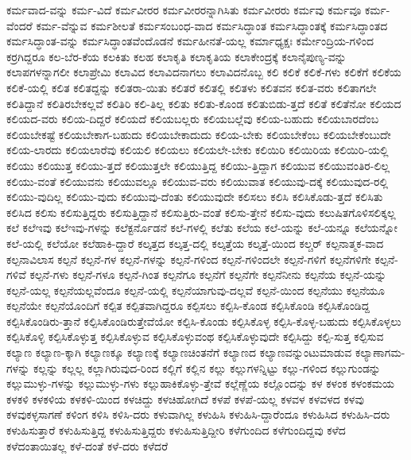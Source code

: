 {ಕರ್ಮವಾದ-ವನ್ನು
ಕರ್ಮ-ವಿದೆ
ಕರ್ಮವೀರರ
ಕರ್ಮವೀರರನ್ನಾಗಿಸಿತು
ಕರ್ಮವೀರರು
ಕರ್ಮವು
ಕರ್ಮವೂ
ಕರ್ಮ-ವೆಂದರೆ
ಕರ್ಮ-ವೆನ್ನುವ
ಕರ್ಮಶೀಲತೆ
ಕರ್ಮಸಂಬಂಧ-ವಾದ
ಕರ್ಮಸಿದ್ಧಾಂತ
ಕರ್ಮಸಿದ್ಧಾಂತಕ್ಕೆ
ಕರ್ಮಸಿದ್ಧಾಂತದ
ಕರ್ಮಸಿದ್ಧಾಂತ-ವನ್ನು
ಕರ್ಮಸಿದ್ಧಾಂತವೆಂದೊಡನೆ
ಕರ್ಮಹೀನತೆ-ಯಲ್ಲ
ಕರ್ಮಾಧ್ಯಕ್ಷಃ
ಕರ್ಮೇಂದ್ರಿಯ-ಗಳಿಂದ
ಕರ್ರಗಿದ್ದರೂ
ಕಲ-ಬೆರ-ಕೆಯ
ಕಲಕಿತು
ಕಲಹ
ಕಲಾಕೃತಿ
ಕಲಾಕೃತಿಯ
ಕಲಾಕೇಂದ್ರಕ್ಕೆ
ಕಲಾನೈಪುಣ್ಯ-ವನ್ನು
ಕಲಾಪಗಳನ್ನಾಗಲೀ
ಕಲಾಪ್ರೇಮಿ
ಕಲಾವಿದ
ಕಲಾವಿದನಾಗಲು
ಕಲಾವಿದನೊಬ್ಬ
ಕಲಿ
ಕಲಿಕೆ
ಕಲಿಕೆ-ಗಳು
ಕಲಿಕೆಗೆ
ಕಲಿಕೆಯ
ಕಲಿಕೆ-ಯಲ್ಲಿ
ಕಲಿತ
ಕಲಿತದ್ದನ್ನು
ಕಲಿತರಾ-ಯಿತು
ಕಲಿತರೆ
ಕಲಿತಲ್ಲಿ
ಕಲಿತಳು
ಕಲಿತವನ
ಕಲಿತ-ವರು
ಕಲಿತಾಗಲೇ
ಕಲಿತಿದ್ದಾನೆ
ಕಲಿತಿರಬೇಕಲ್ಲವೆ
ಕಲಿತಿರಿ
ಕಲಿ-ತಿಲ್ಲ
ಕಲಿತು
ಕಲಿತು-ಕೊಂಡ
ಕಲಿತುಬಿಡು-ತ್ತದೆ
ಕಲಿತೆ
ಕಲಿತೆನೋ
ಕಲಿಯದ
ಕಲಿಯದ-ವರು
ಕಲಿಯ-ದಿದ್ದರೆ
ಕಲಿಯದೆ
ಕಲಿಯಬಲ್ಲರು
ಕಲಿಯಬಲ್ಲೆವು
ಕಲಿಯ-ಬಹುದು
ಕಲಿಯಬಾರದೆಂಬ
ಕಲಿಯಬೇಕಷ್ಟೆ
ಕಲಿಯಬೇಕಾಗ-ಬಹುದು
ಕಲಿಯಬೇಕಾದುದು
ಕಲಿಯ-ಬೇಕು
ಕಲಿಯಬೇಕೆಂಬ
ಕಲಿಯಬೇಕೆಂಬುದೇ
ಕಲಿಯ-ಲಾರದು
ಕಲಿಯಲಾರೆವು
ಕಲಿಯಲಿ
ಕಲಿಯಲು
ಕಲಿಯಲೇ-ಬೇಕು
ಕಲಿಯಿರಿ
ಕಲಿಯಿರಿಯ
ಕಲಿಯಿರಿ-ಯಲ್ಲಿ
ಕಲಿಯು
ಕಲಿಯುತ್ತ
ಕಲಿಯು-ತ್ತದೆ
ಕಲಿಯುತ್ತಲೇ
ಕಲಿಯುತ್ತಿದ್ದ
ಕಲಿಯು-ತ್ತಿದ್ದಾಗ
ಕಲಿಯುವ
ಕಲಿಯುವಂತಿರ-ಲಿಲ್ಲ
ಕಲಿಯು-ವಂತೆ
ಕಲಿಯುವನು
ಕಲಿಯುವಲ್ಲೂ
ಕಲಿಯುವ-ವರು
ಕಲಿಯುವಾತ
ಕಲಿಯುವು-ದಕ್ಕೆ
ಕಲಿಯುವುದ-ರಲ್ಲಿ
ಕಲಿಯು-ವುದಿಲ್ಲ
ಕಲಿಯು-ವುದು
ಕಲಿಯುವು-ದೆಂತು
ಕಲಿಯುವುದೇ
ಕಲಿಸಲು
ಕಲಿಸಿ
ಕಲಿಸಿಕೊಡು-ತ್ತದೆ
ಕಲಿಸಿತು
ಕಲಿಸಿದ
ಕಲಿಸು
ಕಲಿಸುತ್ತಿದ್ದರು
ಕಲಿಸುತ್ತಿದ್ದಾನೆ
ಕಲಿಸುತ್ತಿರು-ವಂತೆ
ಕಲಿಸು-ತ್ತೇನೆ
ಕಲಿಸು-ವುದು
ಕಲುಷಿತಗೊಳಿಸಲಿಕ್ಕಲ್ಲ
ಕಲೆ
ಕಲೆಇವು
ಕಲೆಇವು-ಗಳನ್ನು
ಕಲೆಕ್ಟರ್ನೊಡನೆ
ಕಲೆ-ಗಳಲ್ಲಿ
ಕಲೆತು
ಕಲೆಯ
ಕಲೆ-ಯನ್ನು
ಕಲೆ-ಯನ್ನೂ
ಕಲೆಯನ್ನೋ
ಕಲೆ-ಯಲ್ಲಿ
ಕಲೆಯೋ
ಕಲೆಹಾಕಿ-ದ್ದಾರೆ
ಕಲ್ಕತ್ತದ
ಕಲ್ಕತ್ತ-ದಲ್ಲಿ
ಕಲ್ಕತ್ತೆಯ
ಕಲ್ಕತ್ತೆ-ಯಿಂದ
ಕಲ್ಚರ್
ಕಲ್ಪನಾತ್ಮಕ-ವಾದ
ಕಲ್ಪನಾವಿಲಾಸ
ಕಲ್ಪನೆ
ಕಲ್ಪನೆ-ಗಳ
ಕಲ್ಪನೆ-ಗಳನ್ನು
ಕಲ್ಪನೆ-ಗಳಿಂದ
ಕಲ್ಪನೆ-ಗಳಿಂದಲೇ
ಕಲ್ಪನೆ-ಗಳಿಗೆ
ಕಲ್ಪನೆಗಳಿಗೇ
ಕಲ್ಪನೆ-ಗಳಿವೆ
ಕಲ್ಪನೆ-ಗಳು
ಕಲ್ಪನೆ-ಗಳೂ
ಕಲ್ಪನೆ-ಗಿಂತ
ಕಲ್ಪನೆಗೂ
ಕಲ್ಪನೆಗೆ
ಕಲ್ಪನೆಗೇ
ಕಲ್ಪನೆನೀನು
ಕಲ್ಪನೆಯ
ಕಲ್ಪನೆ-ಯನ್ನು
ಕಲ್ಪನೆ-ಯಲ್ಲ
ಕಲ್ಪನೆಯಲ್ಲವೆಂದೂ
ಕಲ್ಪನೆ-ಯಲ್ಲಿ
ಕಲ್ಪನೆಯಾಗುವು-ದಲ್ಲವೆ
ಕಲ್ಪನೆ-ಯಿಂದ
ಕಲ್ಪನೆಯು
ಕಲ್ಪನೆಯೂ
ಕಲ್ಪನೆಯೇ
ಕಲ್ಪನೆಯೊಂದಿಗೆ
ಕಲ್ಪಿತ
ಕಲ್ಪಿತವಾಗಿದ್ದರೂ
ಕಲ್ಪಿಸಲು
ಕಲ್ಪಿಸಿ-ಕೊಂಡ
ಕಲ್ಪಿಸಿಕೊಂಡಿ
ಕಲ್ಪಿಸಿಕೊಂಡಿದ್ದ
ಕಲ್ಪಿಸಿಕೊಂಡಿರು-ತ್ತಾನೆ
ಕಲ್ಪಿಸಿಕೊಂಡಿರುತ್ತೇವೆಯೋ
ಕಲ್ಪಿಸಿ-ಕೊಂಡು
ಕಲ್ಪಿಸಿಕೊಳ್ಳ
ಕಲ್ಪಿಸಿ-ಕೊಳ್ಳ-ಬಹುದು
ಕಲ್ಪಿಸಿಕೊಳ್ಳಲು
ಕಲ್ಪಿಸಿಕೊಳ್ಳಿ
ಕಲ್ಪಿಸಿಕೊಳ್ಳುತ್ತ
ಕಲ್ಪಿಸಿಕೊಳ್ಳುವ
ಕಲ್ಪಿಸಿಕೊಳ್ಳುವಂಥ
ಕಲ್ಪಿಸಿಕೊಳ್ಳುವುದೇ
ಕಲ್ಪಿಸಿದ್ದು
ಕಲ್ಪಿ-ಸುತ್ತ
ಕಲ್ಪಿಸುವ
ಕಲ್ಯಾಣ
ಕಲ್ಯಾಣ-ಕ್ಕಾಗಿ
ಕಲ್ಯಾಣಕ್ಕೂ
ಕಲ್ಯಾಣಕ್ಕೆ
ಕಲ್ಯಾಣಚಿಂತನೆಗೆ
ಕಲ್ಯಾಣದ
ಕಲ್ಯಾಣವನ್ನುಂಟುಮಾಡುವ
ಕಲ್ಯಾಣಾಗಮ-ಗಳನ್ನು
ಕಲ್ಲನ್ನು
ಕಲ್ಲಲ್ಲ
ಕಲ್ಲಾಗಿರುವುದ-ರಿಂದ
ಕಲ್ಲಿಗೆ
ಕಲ್ಲಿನ
ಕಲ್ಲು
ಕಲ್ಲುಗಳನ್ನಿಟ್ಟು
ಕಲ್ಲು-ಗಳಿಂದ
ಕಲ್ಲುಗುಂಡನ್ನು
ಕಲ್ಲುಮುಳ್ಳು-ಗಳನ್ನು
ಕಲ್ಲುಮುಳ್ಳು-ಗಳು
ಕಲ್ಲುಹಾಕಿಕೊಳ್ಳು-ತ್ತೇವೆ
ಕಲ್ಲೆಣ್ಣೆಯ
ಕಲ್ಲೊಂದನ್ನು
ಕಳ
ಕಳಂಕ
ಕಳಂಕಮಯ
ಕಳಕಳಿ
ಕಳಕಳಿಯ
ಕಳಕಳಿ-ಯಿಂದ
ಕಳಚಿದ್ದು
ಕಳಚಿಹೋಗಿದೆ
ಕಳಪೆ
ಕಳಪೆ-ಯಲ್ಲ
ಕಳವಳ
ಕಳವಳದ
ಕಳವು
ಕಳವುಕಳ್ಳಸಾಗಣೆ
ಕಳಿಂಗ
ಕಳಿಸಿ
ಕಳಿಸಿ-ದರು
ಕಳುವಾಗಿಲ್ಲ
ಕಳುಹಿಸಿ
ಕಳುಹಿಸಿ-ದ್ದಾರೆಂದೂ
ಕಳುಹಿಸಿದ
ಕಳುಹಿಸಿ-ದರು
ಕಳುಹಿಸುತ್ತಾರೆ
ಕಳುಹಿಸುತ್ತಿದ್ದ
ಕಳುಹಿಸುತ್ತಿದ್ದರು
ಕಳುಹಿಸುತ್ತಿದ್ದೀರಿ
ಕಳೆಗುಂದಿದ
ಕಳೆಗುಂದಿದ್ದವು
ಕಳೆದ
ಕಳೆದಂತಾಯಿತಲ್ಲ
ಕಳೆ-ದಂತೆ
ಕಳೆ-ದರು
ಕಳೆದರೆ
}
